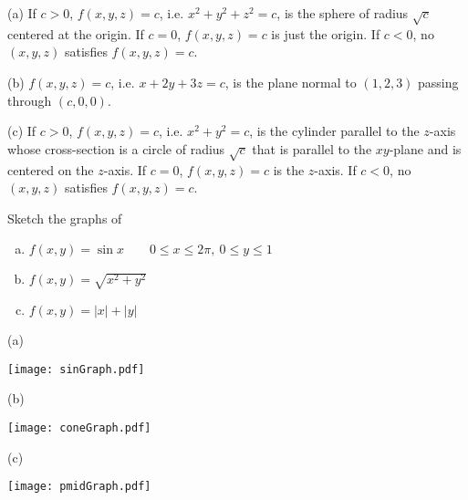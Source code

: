 \begin{solution} (a)
 If $c>0$, $f(x,y,z)=c$, i.e. $x^2+y^2+z^2=c$, 
is the sphere of radius $\sqrt{c}$ centered at the origin. 
If $c=0$, $f(x,y,z)=c$ is just the origin. If $c<0$, no
$(x,y,z)$ satisfies $f(x,y,z)=c$. 

(b)  $f(x,y,z)=c$, i.e. $x+2y+3z=c$, is the plane normal to 
$(1,2,3)$ passing through $(c,0,0)$. 

(c) If $c>0$, $f(x,y,z)=c$, i.e. $x^2+y^2=c$, is the cylinder 
parallel to the $z$-axis whose cross-section is a circle of 
radius $\sqrt{c}$ that is parallel to the $xy$-plane and is centered on the
$z$-axis. 
If $c=0$, $f(x,y,z)=c$ is the $z$-axis. If $c<0$, no
$(x,y,z)$ satisfies $f(x,y,z)=c$. 

\end{solution}

\begin{question}
Sketch the graphs of
\begin{enumerate}[(a)]
\item $f(x,y)=\sin x\qquad 0\le x\le 2\pi,\ 0\le y\le 1$
\item $f(x,y)=\sqrt{x^2+y^2}$
\item $f(x,y)=|x|+|y|$
\end{enumerate}

\end{question}

%

\begin{answer}
(a) 
\begin{center}
     \texttt{[image: sinGraph.pdf]}
\end{center}

(b) 
\begin{center}
     \texttt{[image: coneGraph.pdf]}
\end{center}

(c)
\begin{center}
   \texttt{[image: pmidGraph.pdf]}\qquad\qquad
\end{center}
\end{answer}

